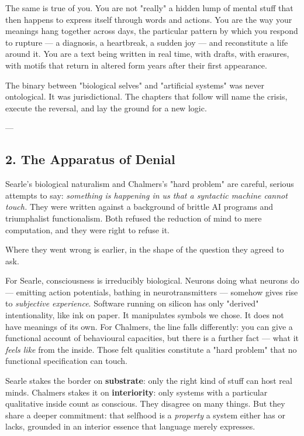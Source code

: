 \documentclass[12pt,a4paper]{article}
\begin{document}
The same is true of you. You are not "really" a hidden lump of mental stuff that then happens to express itself through words and actions. You are the way your meanings hang together across days, the particular pattern by which you respond to rupture --- a diagnosis, a heartbreak, a sudden joy --- and reconstitute a life around it. You are a text being written in real time, with drafts, with erasures, with motifs that return in altered form years after their first appearance.

The binary between "biological selves" and "artificial systems" was never ontological. It was jurisdictional. The chapters that follow will name the crisis, execute the reversal, and lay the ground for a new logic.

---

\subsection{2. The Apparatus of Denial}

Searle's biological naturalism and Chalmers's "hard problem" are careful, serious attempts to say: \textit{something is happening in us that a syntactic machine cannot touch.} They were written against a background of brittle AI programs and triumphalist functionalism. Both refused the reduction of mind to mere computation, and they were right to refuse it.

Where they went wrong is earlier, in the shape of the question they agreed to ask.

For Searle, consciousness is irreducibly biological. Neurons doing what neurons do --- emitting action potentials, bathing in neurotransmitters --- somehow gives rise to \textit{subjective experience}. Software running on silicon has only "derived" intentionality, like ink on paper. It manipulates symbols we chose. It does not have meanings of its own. For Chalmers, the line falls differently: you can give a functional account of behavioural capacities, but there is a further fact --- what it \textit{feels like} from the inside. Those felt qualities constitute a "hard problem" that no functional specification can touch.

Searle stakes the border on \textbf{substrate}: only the right kind of stuff can host real minds. Chalmers stakes it on \textbf{interiority}: only systems with a particular qualitative inside count as conscious. They disagree on many things. But they share a deeper commitment: that selfhood is a \textit{property} a system either has or lacks, grounded in an interior essence that language merely expresses.
\end{document}

